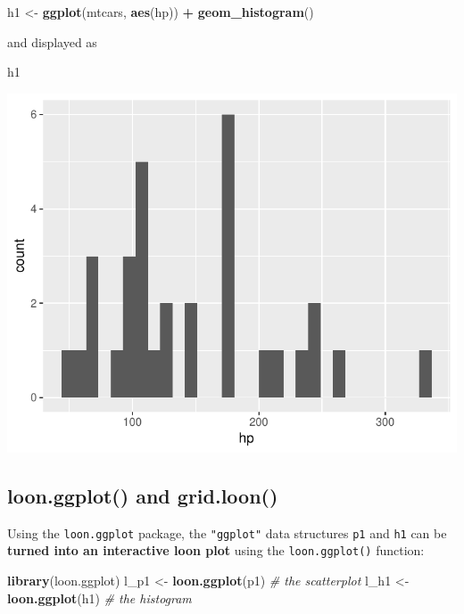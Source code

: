 \documentclass[]{article}
\newenvironment{Shaded}{\begin{snugshade}}{\end{snugshade}}
\newcommand{\KeywordTok}[1]{\textcolor[rgb]{0.13,0.29,0.53}{\textbf{#1}}}
\newcommand{\StringTok}[1]{\textcolor[rgb]{0.31,0.60,0.02}{#1}}
\newcommand{\CommentTok}[1]{\textcolor[rgb]{0.56,0.35,0.01}{\textit{#1}}}
\newcommand{\OperatorTok}[1]{\textcolor[rgb]{0.81,0.36,0.00}{\textbf{#1}}}
\newcommand{\NormalTok}[1]{#1}
\begin{document}
\begin{Shaded}
\begin{Highlighting}[]
\NormalTok{h1 <-}\StringTok{ }\KeywordTok{ggplot}\NormalTok{(mtcars, }\KeywordTok{aes}\NormalTok{(hp)) }\OperatorTok{+}\StringTok{ }\KeywordTok{geom_histogram}\NormalTok{()}
\end{Highlighting}
\end{Shaded}

and displayed as

\begin{Shaded}
\begin{Highlighting}[]
\NormalTok{h1}
\end{Highlighting}
\end{Shaded}

\begin{center}\includegraphics[width=0.5\linewidth]{ggplots2loon_files/figure-latex/hp ggplot display-1} \end{center}

\subsection{loon.ggplot() and
grid.loon()}\label{loon.ggplot-and-grid.loon}

Using the \texttt{loon.ggplot} package, the \texttt{"ggplot"} data
structures \texttt{p1} and \texttt{h1} can be \textbf{turned into an
interactive loon plot} using the \texttt{loon.ggplot()} function:

\begin{Shaded}
\begin{Highlighting}[]
\KeywordTok{library}\NormalTok{(loon.ggplot)}
\NormalTok{l_p1 <-}\StringTok{ }\KeywordTok{loon.ggplot}\NormalTok{(p1)  }\CommentTok{# the scatterplot}
\NormalTok{l_h1 <-}\StringTok{ }\KeywordTok{loon.ggplot}\NormalTok{(h1)  }\CommentTok{# the histogram}
\end{Highlighting}
\end{Shaded}
\end{document}
